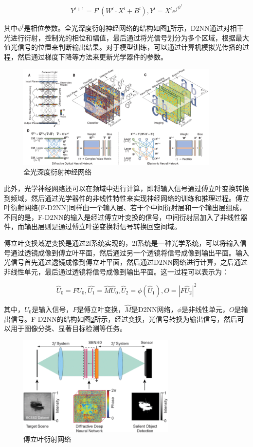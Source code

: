 \begin{equation}
    Y^{l+1}=F^l(W^l\cdot X^l+B^l), Y^{l}=X^{l}{e^j}^{\psi^l}
\end{equation}

其中$\psi^l$是相位参数。全光深度衍射神经网络的结构如图\ref{fig:d2nn}所示，D2NN通过对相干光进行衍射，控制光的相位和幅值，最后通过将光信号划分为多个区域，根据最大值光信号的位置来判断输出结果。对于模型训练，可以通过计算机模拟光传播的过程，然后通过梯度下降等方法来更新光学器件的参数。

\begin{figure}[H]
    \centering
    \includegraphics[width=0.9\textwidth]{pics/d2nn.png}
    \caption{全光深度衍射神经网络}
    \label{fig:d2nn}
\end{figure}

此外，光学神经网络还可以在频域中进行计算，即将输入信号通过傅立叶变换转换到频域，然后通过光学器件的非线性特性来实现神经网络的训练和推理过程。傅立叶衍射网络(F-D2NN)同样由一个输入层、若干个中间衍射层和一个输出层组成，不同的是，F-D2NN的输入是经过傅立叶变换的信号，中间衍射层加入了非线性器件，而输出层则是通过傅立叶逆变换将信号转换回空间域。

傅立叶变换域逆变换是通过2f系统实现的，2f系统是一种光学系统，可以将输入信号通过透镜成像到傅立叶平面，然后通过另一个透镜将信号成像到输出平面。输入光信号首先通过透镜成像到傅立叶平面，然后通过D2NN网络进行计算，之后通过非线性单元，最后通过透镜将信号成像到输出平面。这一过程可以表示为：

\begin{equation}
    \hat{U}_0=FU_0,\hat{U_1}=\hat{M}\hat{U}_0,\hat{U}_2=\phi(\hat{U}_1),O=|F\hat{U}_2|^2
    \label{eq:fd2nn}
\end{equation}

其中，$U_0$是输入信号，$F$是傅立叶变换，$\hat{M}$是D2NN网络，$\phi$是非线性单元，$O$是输出信号。F-D2NN的结构如图\ref{fig:fd2nn}所示，经过变换，光信号转换为输出信号，然后可以用于图像分类、显著目标检测等任务。

\begin{figure}[H]
    \centering
    \includegraphics[width=0.7\textwidth]{pics/fd2nn.png}
    \caption{傅立叶衍射网络}
    \label{fig:fd2nn}
\end{figure}